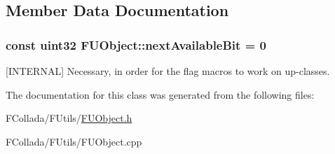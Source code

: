 \subsection{Member Data Documentation}
\hypertarget{classFUObject_a1fe08ae8277bc677dc3339fcc4c03252}{
\subsubsection[{nextAvailableBit}]{\setlength{\rightskip}{0pt plus 5cm}const uint32 {\bf FUObject::nextAvailableBit} = 0}}
\label{classFUObject_a1fe08ae8277bc677dc3339fcc4c03252}
\mbox{[}INTERNAL\mbox{]} Necessary, in order for the flag macros to work on up-\/classes. 

The documentation for this class was generated from the following files:\begin{DoxyCompactItemize}
\item 
FCollada/FUtils/\hyperlink{FUObject_8h}{FUObject.h}\item 
FCollada/FUtils/FUObject.cpp\end{DoxyCompactItemize}
